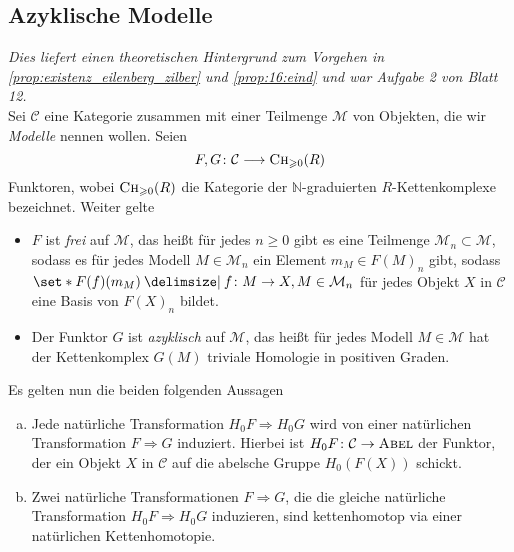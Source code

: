 \subsection{Azyklische Modelle} %
\label{sub:azyklische_modelle}
\emph{Dies liefert einen theoretischen Hintergrund zum Vorgehen in \autoref{prop:existenz_eilenberg_zilber} und \autoref{prop:16:eind} und war Aufgabe 2 von Blatt 12.}\smallskip\\
Sei $\mathcal{C}$ eine Kategorie zusammen mit einer Teilmenge $\mathcal{M}$ von Objekten, die wir \emph{Modelle} nennen wollen.
Seien
\[
	F,G \colon \mathcal{C} \longrightarrow \textsc{Ch}_{\geqslant 0}(R)
\]
Funktoren, wobei $\textsc{Ch}_{\geqslant 0}(R)$ die Kategorie der $\mathbb{N}$-graduierten $R$-Kettenkomplexe bezeichnet.
Weiter gelte
\begin{itemize}
	\item $F$ ist \emph{frei} auf $\mathcal{M}$, das heißt für jedes $n\ge 0$ gibt es eine Teilmenge $\mathcal{M}_n \subset \mathcal{M}$, sodass es für jedes Modell $M \in \mathcal{M}_n$ ein Element $m_M \in F(M)_n$ gibt, sodass $\set*{F(f)(m_M) \given f \colon M \to X, M \in \mathcal{M}_n}$ für jedes Objekt $X$ in $\mathcal{C}$ eine Basis von $F(X)_n$ bildet.
	\item Der Funktor $G$ ist \emph{azyklisch} auf $\mathcal{M}$, das heißt für jedes Modell $M \in \mathcal{M}$ hat der Kettenkomplex $G(M)$ triviale Homologie in positiven Graden.
\end{itemize}
Es gelten nun die beiden folgenden Aussagen
\begin{enumerate}[a)]
	\item Jede natürliche Transformation $H_0 F \Rightarrow H_0 G$ wird von einer natürlichen Transformation $F \Rightarrow G$ induziert.
	Hierbei ist $H_0 F \colon \mathcal{C}\to \textsc{Abel}$ der Funktor, der ein Objekt $X$ in $\mathcal{C}$ auf die abelsche Gruppe $H_0(F(X))$ schickt.
	\item Zwei natürliche Transformationen $F \Rightarrow G$, die die gleiche natürliche Transformation $H_0F \Rightarrow H_0G$ induzieren, sind kettenhomotop via einer natürlichen Kettenhomotopie.
\end{enumerate}
